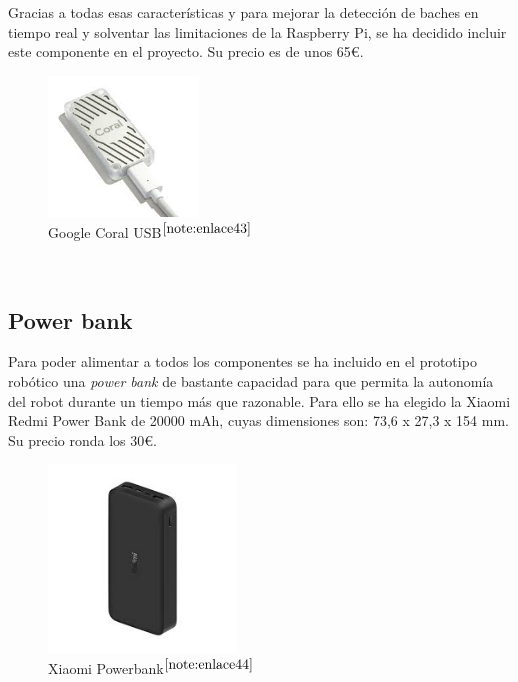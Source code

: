Gracias a todas esas características y para mejorar la detección de baches en tiempo real y solventar las limitaciones de la Raspberry Pi, se ha decidido incluir este componente en el proyecto. Su precio es de unos 65€.
 
\begin{figure} [h!]
	\begin{center}
		\includegraphics[width=4cm]{figs/googlecoral.png}
	\end{center}
	\caption{Google Coral USB$^{\ref{note:enlace43}}$} 
	\label{fig:googlecoral}
\end{figure}\

\setcounter{footnote}{43} %

\subsection{Power bank}

Para poder alimentar a todos los componentes se ha incluido en el prototipo robótico una \textit{power bank} de bastante capacidad para que permita la autonomía del robot durante un tiempo más que razonable. Para ello se ha elegido la Xiaomi Redmi Power Bank de 20000 mAh, cuyas dimensiones son: 73,6 x 27,3 x 154 mm. Su precio ronda los 30€.

\begin{figure} [h!]
	\begin{center}
		\includegraphics[width=5cm]{figs/powerbank.png}
	\end{center}
	\caption{Xiaomi Powerbank$^{\ref{note:enlace44}}$} 
	\label{fig:powerbank}
\end{figure}\

